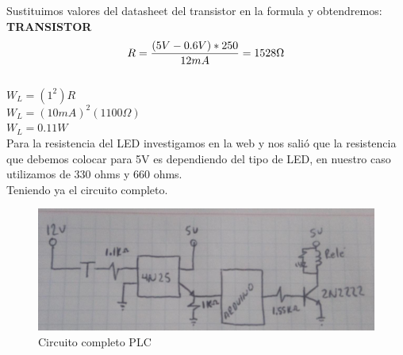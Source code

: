 \documentclass[12pt,a4paper]{article}
\begin{document}
Sustituimos valores del datasheet del transistor en la formula y obtendremos:
\textbf{TRANSISTOR}\\
\begin{equation}
R=\frac{(5V-0.6V)*250}{12mA}=1528\Omega\\
\end{equation}
\\
$W_L=(1^2)R$\\
$W_L=(10mA)^2(1100\Omega)$\\
$W_L=0.11W$\\

Para la resistencia del LED investigamos en la web y nos salió que la resistencia que debemos colocar para 5V es dependiendo del tipo de LED, en nuestro caso utilizamos de 330 ohms y 660 ohms.\\

\newpage
Teniendo ya el circuito completo. 
\begin{figure}[hbtp]
\centering
\includegraphics[scale=0.35]{Circuito/Circuito2.jpeg}
\caption{Circuito completo PLC}
\end{figure}
\end{document}
